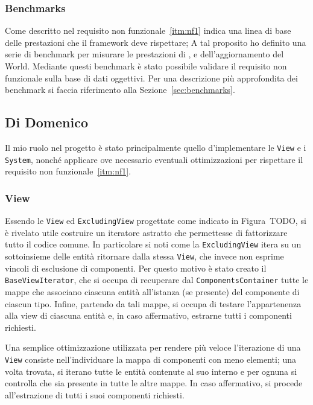 \subsubsection{Benchmarks}
Come descritto nel requisito non funzionale~\ref{itm:nf1} indica una linea di base delle prestazioni che il framework
deve rispettare;
A tal proposito ho definito una serie di benchmark per misurare le prestazioni di \View, \System e dell'aggiornamento
del World.
Mediante questi benchmark è stato possibile validare il requisito non funzionale sulla base di dati oggettivi.
Per una descrizione più approfondita dei benchmark si faccia riferimento alla Sezione~\ref{sec:benchmarks}.

\subsection{Di Domenico}\label{subsec:nicolò-di-domenico}

Il mio ruolo nel progetto è stato principalmente quello d'implementare le \texttt{View} e i \texttt{System}, nonché
applicare ove necessario eventuali ottimizzazioni per rispettare il requisito non funzionale~\ref{itm:nf1}.

\subsubsection{View}

Essendo le \texttt{View} ed \texttt{ExcludingView} progettate come indicato in Figura~TODO, si è rivelato utile
costruire un iteratore astratto che permettesse di fattorizzare tutto il codice comune.
In particolare si noti come la \texttt{ExcludingView} itera su un sottoinsieme delle entità ritornare dalla stessa
\texttt{View}, che invece non esprime vincoli di esclusione di componenti.
Per questo motivo è stato creato il \texttt{BaseViewIterator}, che si occupa di recuperare dal
\texttt{ComponentsContainer} tutte le mappe che associano ciascuna entità all'istanza (se presente) del componente di
ciascun tipo.
Infine, partendo da tali mappe, si occupa di testare l'appartenenza alla view di ciascuna entità e, in caso affermativo,
estrarne tutti i componenti richiesti.

Una semplice ottimizzazione utilizzata per rendere più veloce l'iterazione di una \texttt{View} consiste
nell'individuare la mappa di componenti con meno elementi;
una volta trovata, si iterano tutte le entità contenute al suo interno e per ognuna si controlla che sia presente in
tutte le altre mappe.
In caso affermativo, si procede all'estrazione di tutti i suoi componenti richiesti.

